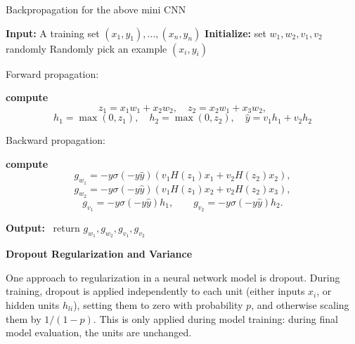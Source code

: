 \documentclass[11pt,addpoints,answers]{exam}
\begin{document}
\begin{questions}
\begin{parts}
\begin{algorithm}[H]
\caption{Backpropagation for the above mini CNN}
\begin{algorithmic}
\State \textbf{Input:} A training set $(x_1,y_1), \dots, (x_n,y_n)$
\State \textbf{Initialize:} set $w_1,w_2,v_1,v_2$ randomly
  \State Randomly pick an example $(x_i,y_i)$

  \State Forward propagation:
  
\begin{solutionorbox}[4in]
  \textbf{compute}
  \[
  z_1 = x_1w_1 + x_2 w_2, \quad 
  z_2 = x_2 w_1 + x_3 w_2,
  \]
  \[
  h_1 = \max(0, z_1), \quad 
  h_2 = \max(0, z_2), \quad
  \hat{y} = v_1 h_1 + v_2 h_2
  \]
\end{solutionorbox}

  \State Backward propagation:
\begin{solutionorbox}[4in]
  
  \textbf{compute}
  \[
  g_{w_1} = -y\sigma(-y\hat{y}) (v_1 H(z_1) x_1 + v_2 H(z_2) x_2),
  \]
  \[
  g_{w_2} = -y\sigma(-y\hat{y}) (v_1 H(z_1) x_2 + v_2 H(z_2) x_3),
  \]
  \[
  g_{v_1} = -y\sigma(-y\hat{y}) h_1,
  \qquad
  g_{v_2} = -y\sigma(-y\hat{y}) h_2.
  \]

  \textbf{Output:} \
  return $g_{w_1}, g_{w_2}, g_{v_1}, g_{v_2}$ 
\end{solutionorbox}
\end{algorithmic}
\end{algorithm}

\end{parts}

\newpage
\question%
{\bf Dropout Regularization and Variance}

One approach to regularization in a neural network model is dropout. During training, dropout is applied independently to each unit (either inputs $x_i$, or hidden units $h_{li}$), setting them to zero with probability $p$, and otherwise scaling them by $1 / (1 - p)$. This is only applied during model training: during final model evaluation, the units are unchanged.

\end{questions}
\end{document}
